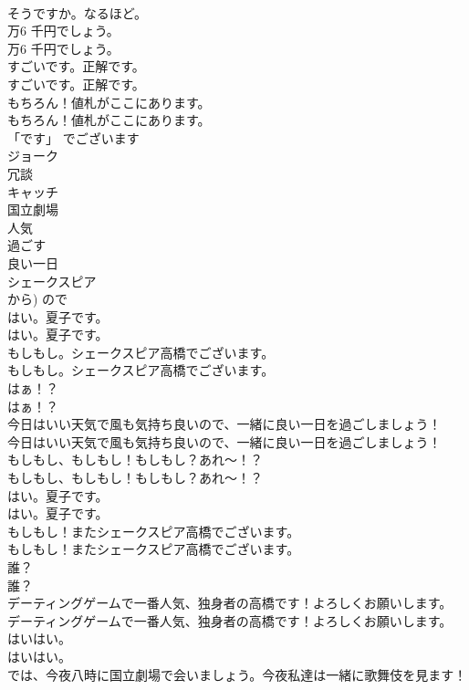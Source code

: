 \documentclass[8pt]{extreport}
\begin{document}
\begin{CJK}{UTF8}{min}
\\	そうですか。なるほど。 
\\	万6 千円でしょう。	
\\	万6 千円でしょう。 
\\	すごいです。正解です。	
\\	すごいです。正解です。 
\\	もちろん！値札がここにあります。	
\\	もちろん！値札がここにあります。 
\\	「です」	でございます
\\	ジョーク
\\	冗談
\\	キャッチ
\\	国立劇場
\\	人気
\\	過ごす
\\	良い一日
\\	シェークスピア
\\	から)	ので
\\	はい。夏子です。	
\\	はい。夏子です。 
\\	もしもし。シェークスピア高橋でございます。	
\\	もしもし。シェークスピア高橋でございます。 
\\	はぁ！？	
\\	はぁ！？ 
\\	今日はいい天気で風も気持ち良いので、一緒に良い一日を過ごしましょう！	
\\	今日はいい天気で風も気持ち良いので、一緒に良い一日を過ごしましょう！ 
\\	もしもし、もしもし！もしもし？あれ～！？	
\\	もしもし、もしもし！もしもし？あれ～！？ 
\\	はい。夏子です。	
\\	はい。夏子です。 
\\	もしもし！またシェークスピア高橋でございます。	
\\	もしもし！またシェークスピア高橋でございます。 
\\	誰？	
\\	誰？ 
\\	デーティングゲームで一番人気、独身者の高橋です！よろしくお願いします。	
\\	デーティングゲームで一番人気、独身者の高橋です！よろしくお願いします。 
\\	はいはい。	
\\	はいはい。 
\\	では、今夜八時に国立劇場で会いましょう。今夜私達は一緒に歌舞伎を見ます！	

\end{CJK}
\end{document}
